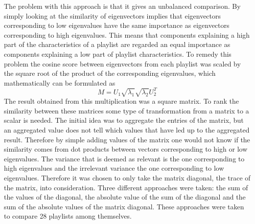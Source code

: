 \documentclass[a4paper,11pt]{kth-mag}
\begin{document}
The problem with this approach is that it gives an unbalanced comparison. By simply looking at the similarity of eigenvectors implies that eigenvectors corresponding to low eigenvalues have the same importance as eigenvectors corresponding to high eigenvalues. This means that components explaining a high part of the characteristics of a playlist are regarded an equal importance as components explaining a low part of playlist characteristics. To remedy this problem the cosine score between eigenvectors from each playlist was scaled by the square root of the product of the corresponding eigenvalues, which mathematically can be formulated as  \[M = U_1 \sqrt{\lambda_1} \sqrt{\lambda_2} U_2^T \] The result obtained from this multiplication was a square matrix. To rank the similarity between these matrices some type of transformation from a matrix to a scalar is needed. The initial idea was to aggregate the entries of the matrix, but an aggregated value does not tell which values that have led up to the aggregated result. Therefore by simple adding values of the matrix one would not know if the similarity comes from dot products between vectors corresponding to high or low eigenvalues. The variance that is deemed as relevant is the one corresponding to high eigenvalues and the irrelevant variance the one corresponding to low eigenvalues. Therefore it was chosen to only take the matrix diagonal, the trace of the matrix, into consideration. Three different approaches were taken: the sum of the values of the diagonal, the absolute value of the sum of the diagonal and the sum of the absolute values of the matrix diagonal. These approaches were taken to compare 28 playlists among themselves.
\end{document}

